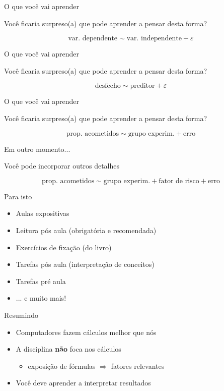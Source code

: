 \documentclass{beamer}
\begin{document}
\begin{frame}{O que você vai aprender}
  \begin{block}{}
    Você ficaria surpreso(a) que pode aprender a pensar desta forma?
  \end{block}

  $$\text{var. dependente} \sim \text{var. independente} + \varepsilon$$
\end{frame}

\begin{frame}{O que você vai aprender}
  \begin{block}{}
    Você ficaria surpreso(a) que pode aprender a pensar desta forma?
  \end{block}

  $$\text{desfecho} \sim \text{preditor} + \varepsilon$$
\end{frame}

\begin{frame}{O que você vai aprender}
  \begin{block}{}
    Você ficaria surpreso(a) que pode aprender a pensar desta forma?
  \end{block}

  $$\text{prop. acometidos} \sim \text{grupo experim.} + \text{erro}$$
\end{frame}

\begin{frame}{Em outro momento...}
  \begin{block}{}
    Você pode incorporar outros detalhes
  \end{block}

  $$\text{prop. acometidos} \sim \text{grupo experim.} + \text{fator de risco} + \text{erro}$$
\end{frame}

\begin{frame}{Para isto}
  \begin{itemize}
  \item Aulas expositivas
  \item Leitura pós aula (obrigatória e recomendada)
  \item Exercícios de fixação (do livro)
  \item Tarefas pós aula (interpretação de conceitos)
  \item Tarefas pré aula
  \item ... e muito mais!
  \end{itemize}
\end{frame}

\begin{frame}{Resumindo}
  \begin{itemize}
  \item Computadores fazem cálculos melhor que nós
  \item A disciplina {\bf não} foca nos cálculos
    \begin{itemize}
    \item exposição de fórmulas $\Rightarrow$ fatores relevantes
    \end{itemize}
  \item Você deve aprender a interpretar resultados
  \end{itemize}
\end{frame}
\end{document}
